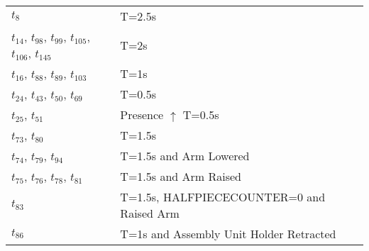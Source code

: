 \begin{longtable}{m{5cm}m{5cm}}
\hyperlink{completeNet:tt8}{\hypertarget{completeTable:tt8}{$t_{8}$}} & T=2.5s\\
\hyperlink{completeNet:tt14}{\hypertarget{completeTable:tt14}{$t_{14}$}}, \hyperlink{completeNet:tt98}{\hypertarget{completeTable:tt98}{$t_{98}$}}, \hyperlink{completeNet:tt99}{\hypertarget{completeTable:tt99}{$t_{99}$}}, \hyperlink{completeNet:tt105}{\hypertarget{completeTable:tt105}{$t_{105}$}}, \hyperlink{completeNet:tt106}{\hypertarget{completeTable:tt106}{$t_{106}$}}, \hyperlink{completeNet:tt145}{\hypertarget{completeTable:tt145}{$t_{145}$}} & T=2s\\
\hyperlink{completeNet:tt16}{\hypertarget{completeTable:tt16}{$t_{16}$}}, \hyperlink{completeNet:tt88}{\hypertarget{completeTable:tt88}{$t_{88}$}}, \hyperlink{completeNet:tt89}{\hypertarget{completeTable:tt89}{$t_{89}$}}, \hyperlink{completeNet:tt103}{\hypertarget{completeTable:tt103}{$t_{103}$}} & T=1s\\
\hyperlink{completeNet:tt24}{\hypertarget{completeTable:tt24}{$t_{24}$}}, \hyperlink{completeNet:tt43}{\hypertarget{completeTable:tt43}{$t_{43}$}}, \hyperlink{completeNet:tt50}{\hypertarget{completeTable:tt50}{$t_{50}$}}, \hyperlink{completeNet:tt69}{\hypertarget{completeTable:tt69}{$t_{69}$}} & T=0.5s\\
\hyperlink{completeNet:tt25}{\hypertarget{completeTable:tt25}{$t_{25}$}}, \hyperlink{completeNet:tt51}{\hypertarget{completeTable:tt51}{$t_{51}$}} & Presence \(\uparrow\) T=0.5s\\
\hyperlink{completeNet:tt73}{\hypertarget{completeTable:tt73}{$t_{73}$}}, \hyperlink{completeNet:tt80}{\hypertarget{completeTable:tt80}{$t_{80}$}} & T=1.5s\\
\hyperlink{completeNet:tt74}{\hypertarget{completeTable:tt74}{$t_{74}$}}, \hyperlink{completeNet:tt79}{\hypertarget{completeTable:tt79}{$t_{79}$}}, \hyperlink{completeNet:tt94}{\hypertarget{completeTable:tt94}{$t_{94}$}} & T=1.5s and Arm Lowered\\
\hyperlink{completeNet:tt75}{\hypertarget{completeTable:tt75}{$t_{75}$}}, \hyperlink{completeNet:tt76}{\hypertarget{completeTable:tt76}{$t_{76}$}}, \hyperlink{completeNet:tt78}{\hypertarget{completeTable:tt78}{$t_{78}$}}, \hyperlink{completeNet:tt81}{\hypertarget{completeTable:tt81}{$t_{81}$}} & T=1.5s and Arm Raised\\
\hyperlink{completeNet:tt83}{\hypertarget{completeTable:tt83}{$t_{83}$}} & T=1.5s, HALFPIECECOUNTER=0 and Raised Arm\\
\hyperlink{completeNet:tt86}{\hypertarget{completeTable:tt86}{$t_{86}$}} & T=1s and Assembly Unit Holder Retracted\\

\end{longtable}

